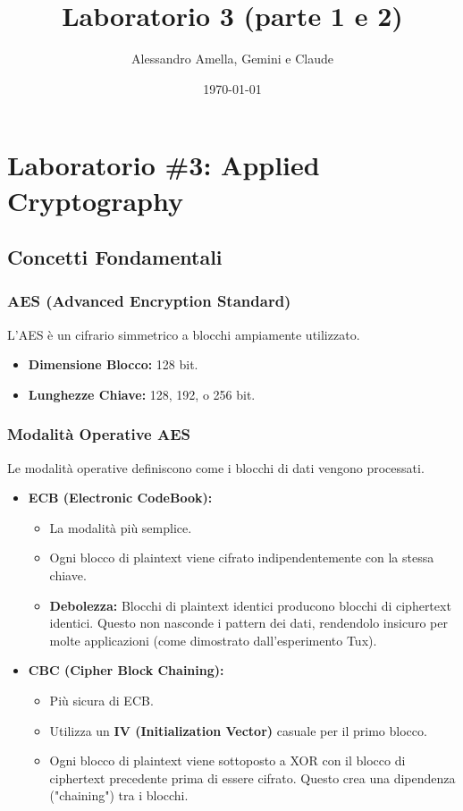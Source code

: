 

\title{Laboratorio 3 (parte 1 e 2)}
\author{Alessandro Amella, Gemini e Claude}
\date{\today}



\maketitle
\tableofcontents
\newpage

\section{Laboratorio \#3: Applied Cryptography}

\subsection{Concetti Fondamentali}

\subsubsection{AES (Advanced Encryption Standard)}
L'AES è un cifrario simmetrico a blocchi ampiamente utilizzato.
\begin{itemize}
    \item \textbf{Dimensione Blocco:} 128 bit.
    \item \textbf{Lunghezze Chiave:} 128, 192, o 256 bit.
\end{itemize}

\subsubsection*{Modalità Operative AES}
Le modalità operative definiscono come i blocchi di dati vengono processati.
\begin{itemize}
    \item \textbf{ECB (Electronic CodeBook):}
    \begin{itemize}
        \item La modalità più semplice.
        \item Ogni blocco di plaintext viene cifrato indipendentemente con la stessa chiave.
        \item \textbf{Debolezza:} Blocchi di plaintext identici producono blocchi di ciphertext identici. Questo non nasconde i pattern dei dati, rendendolo insicuro per molte applicazioni (come dimostrato dall'esperimento Tux).
    \end{itemize}
    \item \textbf{CBC (Cipher Block Chaining):}
    \begin{itemize}
        \item Più sicura di ECB.
        \item Utilizza un \textbf{IV (Initialization Vector)} casuale per il primo blocco.
        \item Ogni blocco di plaintext viene sottoposto a XOR con il blocco di ciphertext precedente prima di essere cifrato. Questo crea una dipendenza ("chaining") tra i blocchi.
    \end{itemize}
\end{itemize}

